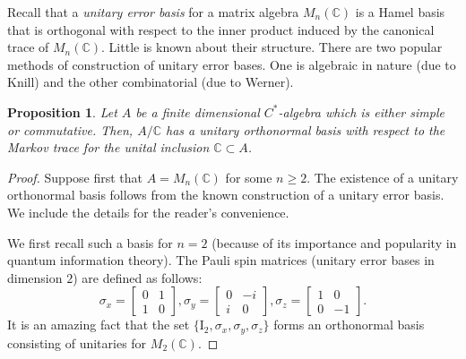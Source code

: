 \documentclass{amsart}
\newtheorem{proposition}[theorem]{Proposition}
\theoremstyle{definition}
\theoremstyle{theorem}
\newcommand{\C}{\mathbb{C}}
\begin{document}
 Recall that a {\it
  unitary error basis} for a matrix algebra $M_n(\C)$ is a Hamel basis
that is orthogonal with respect to the inner product induced by the
canonical trace of $M_n(\C)$. Little is known about their
structure. There are  two popular methods of construction
of unitary error bases. One is algebraic in nature (due to Knill) and the
other combinatorial (due to Werner). 
 
\begin{proposition}\label{unitary-onb}
 Let $A$ be a finite dimensional $C^*$-algebra which is either simple
 or commutative. Then, $A/\C$ has a unitary orthonormal basis with
 respect to the Markov trace for the unital inclusion $\C \subset A$.
\end{proposition}
\begin{proof}
 Suppose first that $A=M_n(\C)$ for some $n \geq 2$. The existence of
 a unitary orthonormal basis follows from the known construction of a
 unitary error basis. We include the
 details for the reader's convenience.

 We first recall such a basis for $n=2$ (because of its importance and
 popularity in quantum information theory).  The Pauli spin
 matrices (unitary error bases in dimension $2$) are defined as
 follows:
$$\sigma_x=\begin{bmatrix}
           0 & 1\\
           1 & 0
          \end{bmatrix},
          \sigma_y=\begin{bmatrix}
                    0 & -i\\
                    i & 0
                   \end{bmatrix},
                   \sigma_z=\begin{bmatrix}
                             1 & 0\\
                             0 & -1
                            \end{bmatrix}.
$$ It is an amazing fact that the set
                   $\{\mathrm{I}_2,\sigma_x,\sigma_y,\sigma_z\}$ forms
                   an orthonormal basis consisting of unitaries for
                   $M_2(\C).$
  

\end{proof}
\end{document}
